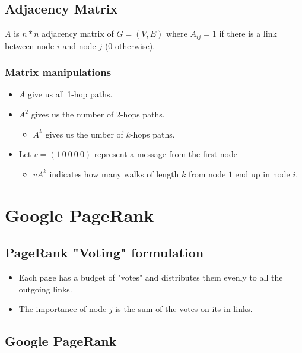 \subsection{Adjacency Matrix}

$A$ is $n*n$ adjacency matrix of $G=(V,E)$ where $A_{ij} = 1$ if there is a link between node $i$ and node $j$ ($0$ otherwise).

\subsubsection{Matrix manipulations}

\begin{itemize}
\item $A$ give us all 1-hop paths.
\item $A^2$ gives us the number of 2-hops paths.
	\begin{itemize}
	\item $A^k$ gives us the umber of $k$-hops paths.
	\end{itemize}
\item Let $v = (1\ 0\ 0\ 0\ 0)$ represent a message from the first node
	\begin{itemize}
	\item $vA^k$ indicates how many walks of length $k$ from node $1$ end up in node $i$.
	\end{itemize}
\end{itemize}

\section{Google PageRank}

\subsection{PageRank "Voting" formulation}

\begin{itemize}
\item Each page has a budget of "votes" and distributes them evenly to all the outgoing links.
\item The importance of node $j$ is the sum of the votes on its in-links.
\end{itemize}

\subsection{Google PageRank}

